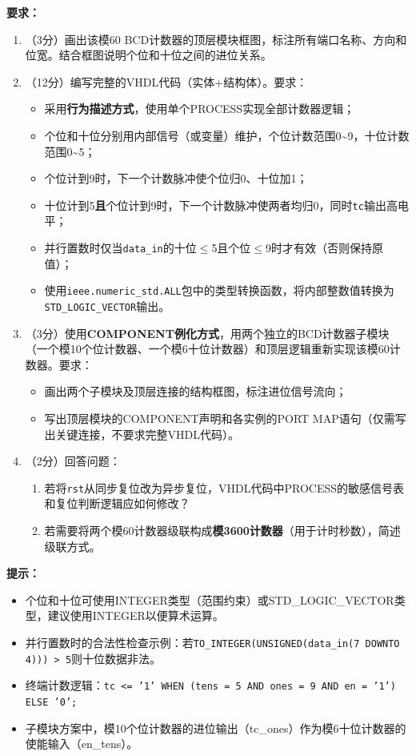 \textbf{要求：}
\begin{enumerate}[label=(\arabic*)]
  \item （3分）画出该模60 BCD计数器的顶层模块框图，标注所有端口名称、方向和位宽。结合框图说明个位和十位之间的进位关系。
  \item （12分）编写完整的VHDL代码（实体+结构体）。要求：
  \begin{itemize}
    \item 采用\textbf{行为描述方式}，使用单个PROCESS实现全部计数器逻辑；
    \item 个位和十位分别用内部信号（或变量）维护，个位计数范围0\~{}9，十位计数范围0\~{}5；
    \item 个位计到9时，下一个计数脉冲使个位归0、十位加1；
    \item 十位计到5\textbf{且}个位计到9时，下一个计数脉冲使两者均归0，同时\texttt{tc}输出高电平；
    \item 并行置数时仅当\texttt{data\_in}的十位$\le$5且个位$\le$9时才有效（否则保持原值）；
    \item 使用\texttt{ieee.numeric\_std.ALL}包中的类型转换函数，将内部整数值转换为\texttt{STD\_LOGIC\_VECTOR}输出。
  \end{itemize}
  \item （3分）使用\textbf{COMPONENT例化方式}，用两个独立的BCD计数器子模块（一个模10个位计数器、一个模6十位计数器）和顶层逻辑重新实现该模60计数器。要求：
  \begin{itemize}
    \item 画出两个子模块及顶层连接的结构框图，标注进位信号流向；
    \item 写出顶层模块的COMPONENT声明和各实例的PORT MAP语句（仅需写出关键连接，不要求完整VHDL代码）。
  \end{itemize}
  \item （2分）回答问题：
  \begin{enumerate}
    \item 若将\texttt{rst}从同步复位改为异步复位，VHDL代码中PROCESS的敏感信号表和复位判断逻辑应如何修改？
    \item 若需要将两个模60计数器级联构成\textbf{模3600计数器}（用于计时秒数），简述级联方式。
  \end{enumerate}
\end{enumerate}

\begin{framed}
\textbf{提示：}
\begin{itemize}
  \item 个位和十位可使用INTEGER类型（范围约束）或STD\_LOGIC\_VECTOR类型，建议使用INTEGER以便算术运算。
  \item 并行置数时的合法性检查示例：若\texttt{TO\_INTEGER(UNSIGNED(data\_in(7 DOWNTO 4))) > 5}则十位数据非法。
  \item 终端计数逻辑：\texttt{tc <= '1' WHEN (tens = 5 AND ones = 9 AND en = '1') ELSE '0';}
  \item 子模块方案中，模10个位计数器的进位输出（tc\_ones）作为模6十位计数器的使能输入（en\_tens）。
\end{itemize}
\end{framed}

